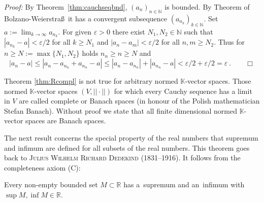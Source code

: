 {\em Proof:} 
By Theorem~\ref{thm:cauchseqbnd}, $(a_n)_{n\in\mathbb{N}}$ is bounded. By Theorem of Bolzano-Weierstra\ss \ it has a convergent 
subsequence $(a_{n_k})_{k\in\mathbb{N}}$. Set $a:=\lim_{k\rightarrow\infty} a_{n_k}$. For given $\varepsilon>0$ there exist $N_1,N_2\in\mathbb{N}$ such 
that $|a_{n_k}-a|<\varepsilon/2$ for all $k\geq N_1$ and $|a_n-a_m|<\varepsilon/2$ for all $n,m\geq N_2$. Thus for $n\geq N:=\max\{N_1,N_2\}$ holds
$n_n\geq n\geq N$ and $$|a_n-a|\leq|a_n-a_{n_n}+a_{n_n}-a|\leq|a_n-a_{n_n}|+|a_{n_n}-a|< \varepsilon/2+\varepsilon/2=\varepsilon \ . \qquad\Box$$

Theorem \ref{thm:Rcompl} is not true for arbitrary normed $\mathbb{K}$-vector spaces. 
Those normed $\mathbb{K}$-vector spaces $(V,||\cdot||)$ for which every Cauchy sequence has a limit in $V$ are called complete
or Banach spaces (in honour of the Polish mathematician Stefan Banach). 
Without proof we state that all finite dimensional normed $\mathbb{K}$-vector spaces are Banach spaces.

The next result concerns the special property of the real numbers that supremum and infimum are defined for all subsets of the real numbers. This theorem goes back to \textsc{Julius Wilhelm Richard Dedekind} (1831--1916). It follows from the completeness axiom (C):
\begin{Theorem}
\label{thm:bndmonseq}
    Every non-empty bounded set $M\subset \mathbb{R}$ has a~supremum and an~infimum with $\sup M,\inf M\in\mathbb{R}$.
\end{Theorem}

